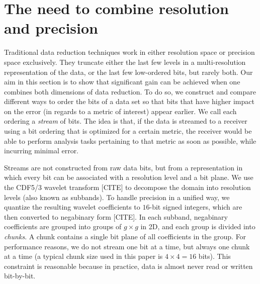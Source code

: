 

\section{The need to combine resolution and precision}

Traditional data reduction techniques work in either resolution space or precision space
exclusively. They truncate either the last few levels in a multi-resolution representation of the
data, or the last few low-ordered bits, but rarely both. Our aim in this section is to show that
significant gain can be achieved when one combines both dimensions of data reduction. To do so, we
construct and compare different ways to order the bits of a data set so that bits that have higher
impact on the error (in regards to a metric of interest) appear earlier. We call each ordering a
\emph{stream} of bits. The idea is that, if the data is streamed to a receiver using a bit ordering
that is optimized for a certain metric, the receiver would be able to perform analysis tasks
pertaining to that metric as soon as possible, while incurring minimal error.

Streams are not constructed from raw data bits, but from a representation in which every bit can be
associated with a resolution level and a bit plane. We use the CDF5/3 wavelet transform [CITE] to
decompose the domain into resolution levels (also known as subbands). To handle precision in a
unified way, we quantize the resulting wavelet coefficients to $16$-bit signed integers, which are
then converted to negabinary form [CITE]. In each subband, negabinary coefficients are grouped into
groups of $g \times g$ in 2D, and each group is divided into \emph{chunks}. A chunk contains a
single bit plane of all coefficients in the group. For performance reasons, we do not stream one bit
at a time, but always one chunk at a time (a typical chunk size used in this paper is $4 \times 4 =
16$ bits). This constraint is reasonable because in practice, data is almost never read or written
bit-by-bit.


